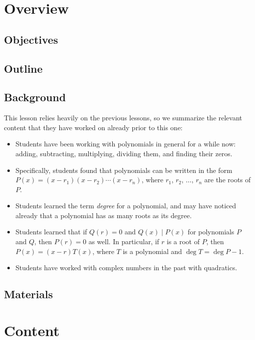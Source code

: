 \section{Overview}

\subsection{Objectives}

\subsection{Outline}

\subsection{Background}

This lesson relies heavily on the previous lessons, so we summarize the relevant content that they have worked on already prior to this one:
\begin{itemize}
    \item Students have been working with polynomials in general for a while now: adding, subtracting, multiplying, dividing them, and finding their zeros.
    \item Specifically, students found that polynomials can be written in the form $P(x) = (x-r_1)(x-r_2)\cdots (x-r_n)$, where $r_1$, $r_2$, $\dots$, $r_n$ are the roots of $P$.
    \item Students learned the term \textit{degree} for a polynomial, and may have noticed already that a polynomial has as many roots as its degree.
    \item Students learned that if $Q(r) = 0$ and $Q(x) \mid P(x)$ for polynomials $P$ and $Q$, then $P(r) = 0$ as well. In particular, if $r$ is a root of $P$, then $P(x) = (x-r)T(x)$, where $T$ is a polynomial and $\deg T = \deg P - 1$.
    \item Students have worked with complex numbers in the past with quadratics.
\end{itemize}

\subsection{Materials}

\section{Content}